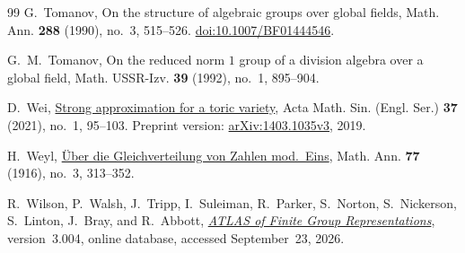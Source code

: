 \begin{thebibliography}{99}
G.~Tomanov,
On the structure of algebraic groups over global fields,
Math. Ann. \textbf{288} (1990), no.~3, 515--526.
\href{https://doi.org/10.1007/BF01444546}{doi:10.1007/BF01444546}.

G.~M.~Tomanov,
On the reduced norm $1$ group of a division algebra over a global field,
Math. USSR-Izv. \textbf{39} (1992), no.~1, 895--904.

D.~Wei,
\href{https://doi.org/10.1007/s10114-021-8193-7}{Strong approximation
for a toric variety},
Acta Math. Sin. (Engl. Ser.) \textbf{37} (2021), no.~1, 95--103.
Preprint version: \href{https://arxiv.org/abs/1403.1035v3}
{arXiv:1403.1035v3}, 2019.

H.~Weyl,
\href{https://doi.org/10.1007/BF01475864}{\"Uber die Gleichverteilung
von Zahlen mod.~Eins},
Math. Ann. \textbf{77} (1916), no.~3, 313--352.

R.~Wilson, P.~Walsh, J.~Tripp, I.~Suleiman, R.~Parker, S.~Norton,
S.~Nickerson, S.~Linton, J.~Bray, and R.~Abbott,
\emph{\href{https://brauer.maths.qmul.ac.uk/Atlas/v3/}{ATLAS of Finite
Group Representations}}, version~3.004, online database,
accessed September~23, 2026.

\end{thebibliography}
